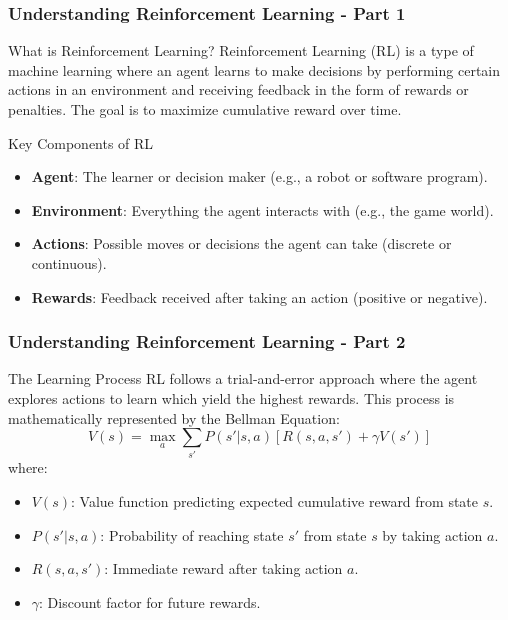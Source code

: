 \documentclass[aspectratio=169]{beamer}
\begin{document}
\begin{frame}[fragile]
    \frametitle{Understanding Reinforcement Learning - Part 1}
    \begin{block}{What is Reinforcement Learning?}
        Reinforcement Learning (RL) is a type of machine learning where an agent learns to make decisions by performing certain actions in an environment and receiving feedback in the form of rewards or penalties. The goal is to maximize cumulative reward over time.
    \end{block}
    
    \begin{block}{Key Components of RL}
        \begin{itemize}
            \item \textbf{Agent}: The learner or decision maker (e.g., a robot or software program).
            \item \textbf{Environment}: Everything the agent interacts with (e.g., the game world).
            \item \textbf{Actions}: Possible moves or decisions the agent can take (discrete or continuous).
            \item \textbf{Rewards}: Feedback received after taking an action (positive or negative).
        \end{itemize}
    \end{block}
\end{frame}

\begin{frame}[fragile]
    \frametitle{Understanding Reinforcement Learning - Part 2}
    \begin{block}{The Learning Process}
        RL follows a trial-and-error approach where the agent explores actions to learn which yield the highest rewards. This process is mathematically represented by the Bellman Equation:
        \begin{equation}
            V(s) = \max_a \sum_{s'} P(s'|s,a) \left[ R(s,a,s') + \gamma V(s') \right]
        \end{equation}
        where:
        \begin{itemize}
            \item $V(s)$: Value function predicting expected cumulative reward from state $s$.
            \item $P(s'|s,a)$: Probability of reaching state $s'$ from state $s$ by taking action $a$.
            \item $R(s,a,s')$: Immediate reward after taking action $a$.
            \item $\gamma$: Discount factor for future rewards.
        \end{itemize}
    \end{block}
\end{frame}
\end{document}
